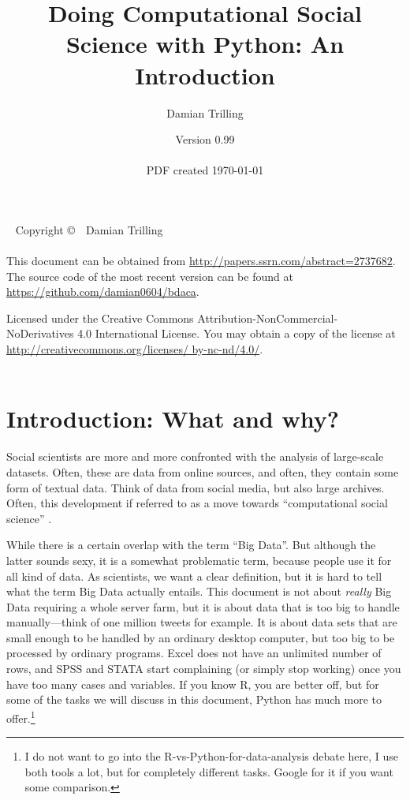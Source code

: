 \documentclass[a4paper,12pt]{book}
\title{Doing Computational Social Science with Python: An Introduction}
\author{Damian Trilling}
\date{Version 0.99\\ ~ \\  \footnotesize{PDF created \today}}
\begin{document}
\frontmatter

\maketitle

\newpage

{~\vfill
\thispagestyle{empty}
\setlength{\parindent}{0pt}
\setlength{\parskip}{\baselineskip}
Copyright \copyright\ \the\year\ Damian Trilling\\
\vspace{.25cm} \\
This document can be obtained from \url{http://papers.ssrn.com/abstract=2737682}. The source code of the most recent version can be found at \url{https://github.com/damian0604/bdaca}.


\par Licensed under the Creative Commons Attribution-NonCommercial-NoDerivatives 4.0 International License. You may obtain a copy of the license at \url{http://creativecommons.org/licenses/ by-nc-nd/4.0/}. \\
\vspace{.5cm} \\
\ccbyncnd

}


\newpage

\tableofcontents


\chapter{Introduction: What and why?}

Social scientists are more and more confronted with the analysis of large-scale datasets. Often, these are data from online sources, and often, they contain some form of textual data. Think of data from social media, but also large archives. Often, this development if referred to as a move towards ``computational social science'' \cite{Lazer2009,Kitchin2014}.

While there is a certain overlap with the term ``Big Data''. But although the latter sounds sexy, it is a somewhat problematic term, because people use it for all kind of data. As scientists, we want a clear definition, but it is hard to tell what the term Big Data actually entails. This document is not about \emph{really} Big Data requiring a whole server farm, but it is about data that is too big to handle manually---think of one million tweets for example. It is about data sets that are small enough to be handled by an ordinary desktop computer, but too big to be processed by ordinary programs. Excel does not have an unlimited number of rows, and SPSS and STATA start complaining (or simply stop working) once you have too many cases and variables. If you know R, you are better off, but for some of the tasks we will discuss in this document, Python has much more to offer.\footnote{I do not want to go into the R-vs-Python-for-data-analysis debate here, I use both tools a lot, but for completely different tasks. Google for it if you want some comparison.}  
\end{document}
